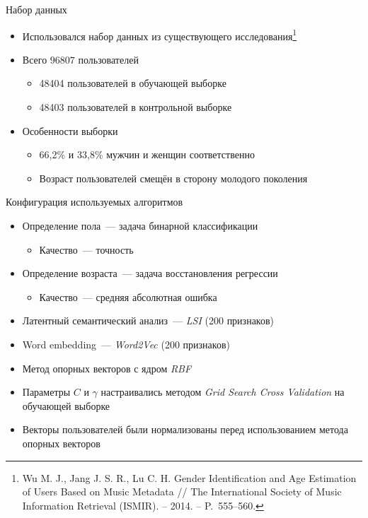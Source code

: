 \documentclass{beamer}
\begin{document}
\begin{frame}{Набор данных}
    \begin{itemize}
        \item {Использовался набор данных из существующего 
              исследования\footnote{Wu M. J.,
              Jang J. S. R., Lu C. H. Gender Identification
              and Age Estimation of Users Based on Music 
              Metadata // The International Society of Music Information Retrieval (ISMIR). – 2014. – P.~555--560.}}
        \item {Всего $96807$ пользователей}
            \begin{itemize}
                \item {48404 пользователей в обучающей выборке}
                \item {48403 пользователей в контрольной выборке}
            \end{itemize}
        \item {Особенности выборки}
            \begin{itemize}
                \item {66{,}2\% и 33{,}8\% мужчин и женщин соответственно}
                \item {Возраст пользователей смещён в сторону молодого поколения}
            \end{itemize}
    \end{itemize}
\end{frame}

\begin{frame}{Конфигурация используемых алгоритмов}
  \begin{itemize}
      \item {Определение пола~--- задача бинарной классификации}
          \begin{itemize}
              \item {Качество~--- точность}
          \end{itemize}
      \item {Определение возраста~--- задача восстановления регрессии}
          \begin{itemize}
              \item {Качество~--- средняя абсолютная ошибка}
          \end{itemize}
      \item {Латентный семантический анализ~--- \textit{LSI} (200 признаков)}
      \item {Word embedding~--- \textit{Word2Vec} (200 признаков)}
      \item {Метод опорных векторов с ядром \textit{RBF}}
      \item {Параметры $C$ и $\gamma$ настраивались методом \textit{Grid Search Cross Validation} на обучающей выборке}
      \item {Векторы пользователей были нормализованы перед использованием метода опорных векторов}
  \end{itemize}
\end{frame}
\end{document}
